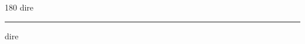 
\begin{frame}
\begin{center}
\begin{turn}{180}
{\fontsize{2.5cm}{1em}\selectfont dire}
\end{turn}
\vspace{1em}\par  
\hrule
\vspace{1em}\par  
{\fontsize{2.5cm}{1em}\selectfont dire}
\end{center}
\end{frame}
